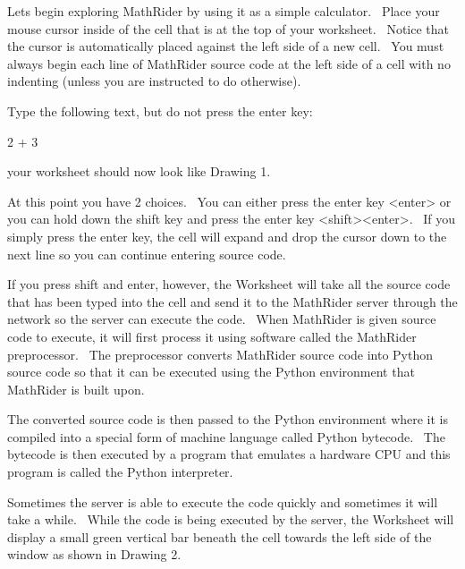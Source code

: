 \documentclass[12pt,twoside]{book}
\begin{document}
Lets begin exploring MathRider by using it as a simple calculator. \ Place your mouse cursor inside of the cell that is at the top of your worksheet. \ Notice that the cursor is automatically placed against the left side of a new cell. \ You must always begin each line of MathRider source code at the left side of a cell with no indenting (unless you are instructed to do otherwise). 

\bigskip

Type the following text, but do not press the enter key:


\bigskip

2 + 3


\bigskip

your worksheet should now look like Drawing 1.


\bigskip


\bigskip


\bigskip

At this point you have 2 choices. \ You can either press the enter key {\textless}enter{\textgreater} or you can hold down the shift key and press the enter key {\textless}shift{\textgreater}{\textless}enter{\textgreater}. \ If you simply press the enter key, the cell will expand and drop the cursor down to the next line so you can continue entering source code. 

\bigskip

If you press shift and enter, however, the Worksheet will take all the source code that has been typed into the cell and send it to the MathRider server through the network so the server can execute the code. \ When MathRider is given source code to execute, it will first process it using software called the MathRider preprocessor. \ The preprocessor converts MathRider source code into Python source code so that it can be executed using the Python environment that MathRider is built upon. 

\bigskip

The converted source code is then passed to the Python environment where it is compiled into a special form of machine language called Python bytecode. \ The bytecode is then executed by a program that emulates a hardware CPU and this program is called the Python interpreter.  

\bigskip

Sometimes the server is able to execute the code quickly and sometimes it will take a while. \ While the code is being executed by the server, the Worksheet will display a small green vertical bar beneath the cell towards the left side of the window as shown in Drawing 2. 
\end{document}
